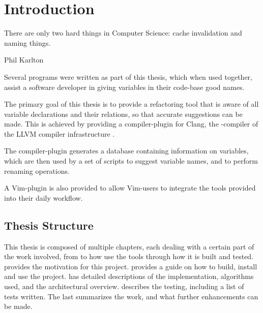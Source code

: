 \chapter{Introduction}
\label{chap:Introduction}

\epigraph{There are only two hard things in Computer Science: cache invalidation
	and naming things.}{Phil Karlton}

Several programs were written as part of this thesis, which when used together,
assist a software developer in giving variables in their \CC{} code-base good
names.

The primary goal of this thesis is to provide a refactoring tool that is aware
of all variable declarations and their relations, so that accurate suggestions
can be made. This is achieved by providing a compiler-plugin for Clang, the
\CC{}-compiler of the LLVM compiler infrastructure \cite{llvm}.

The compiler-plugin generates a database containing information on variables,
which are then used by a set of scripts to suggest variable names, and to
perform renaming operations.

A Vim-plugin is also provided to allow Vim-users to integrate the tools provided
into their daily workflow.

\section{Thesis Structure}
This thesis is composed of multiple chapters, each dealing with a certain part
of the work involved, from to how use the tools through how it is built and
tested.
 provides the motivation for this project.
 provides a guide on how to build, install and use the
project.
 has detailed descriptions of the implementation,
algorithms used, and the architectural overview.
 describes the testing, including a list of tests written.
The last  summarizes the work, and what further enhancements
can be made.
